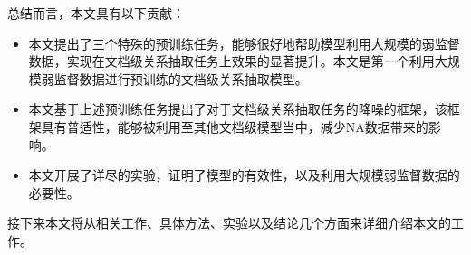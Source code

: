 \hspace*{\fill}

总结而言，本文具有以下贡献：
\begin{itemize}
	\item 本文提出了三个特殊的预训练任务，能够很好地帮助模型利用大规模的弱监督数据，实现在文档级关系抽取任务上效果的显著提升。本文是第一个利用大规模弱监督数据进行预训练的文档级关系抽取模型。
	\item 本文基于上述预训练任务提出了对于文档级关系抽取任务的降噪的框架，该框架具有普适性，能够被利用至其他文档级模型当中，减少NA数据带来的影响。
	\item 本文开展了详尽的实验，证明了模型的有效性，以及利用大规模弱监督数据的必要性。
\end{itemize}

接下来本文将从相关工作、具体方法、实验以及结论几个方面来详细介绍本文的工作。









